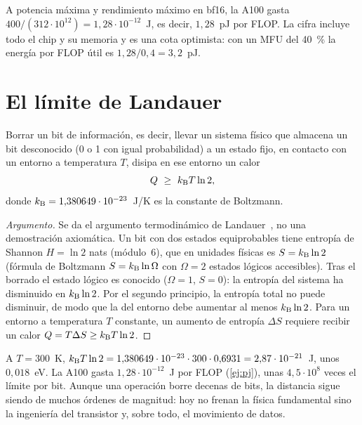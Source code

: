 \begin{ejemplo}\label{ej:pj}
A potencia máxima y rendimiento máximo en bf16, la A100 gasta $400/(312\cdot 10^{12})=1{,}28\cdot 10^{-12}$~J, es decir, $1{,}28$~pJ por FLOP. La cifra incluye todo el chip y su memoria y es una cota optimista: con un MFU del 40~\% la energía por FLOP útil es $1{,}28/0{,}4=3{,}2$~pJ.
\end{ejemplo}

\section{El límite de Landauer}

\begin{teorema}\label{teo:landauer}
Borrar un bit de información, es decir, llevar un sistema físico que almacena un bit desconocido (0 o 1 con igual probabilidad) a un estado fijo, en contacto con un entorno a temperatura $T$, disipa en ese entorno un calor
\[
Q\ \ge\ k_{\mathrm{B}} T\ln 2,
\]
donde $k_{\mathrm{B}}=1{,}380649\cdot 10^{-23}$~J/K es la constante de Boltzmann.
\end{teorema}

\begin{proof}[Argumento]
Se da el argumento termodinámico de Landauer~\cite{landauer}, no una demostración axiomática. Un bit con dos estados equiprobables tiene entropía de Shannon $H=\ln 2$ nats (módulo~6), que en unidades físicas es $S=k_{\mathrm{B}}\ln 2$ (fórmula de Boltzmann $S=k_{\mathrm{B}}\ln\Omega$ con $\Omega=2$ estados lógicos accesibles). Tras el borrado el estado lógico es conocido ($\Omega=1$, $S=0$): la entropía del sistema ha disminuido en $k_{\mathrm{B}}\ln 2$. Por el segundo principio, la entropía total no puede disminuir, de modo que la del entorno debe aumentar al menos $k_{\mathrm{B}}\ln 2$. Para un entorno a temperatura $T$ constante, un aumento de entropía $\Delta S$ requiere recibir un calor $Q=T\Delta S\ge k_{\mathrm{B}} T\ln 2$.
\end{proof}

\begin{ejemplo}\label{ej:landauer}
A $T=300$~K, $k_{\mathrm{B}} T\ln 2=1{,}380649\cdot 10^{-23}\cdot 300\cdot 0{,}6931=2{,}87\cdot 10^{-21}$~J, unos $0{,}018$~eV. La A100 gasta $1{,}28\cdot 10^{-12}$~J por FLOP (\cref{ej:pj}), unas $4{,}5\cdot 10^{8}$ veces el límite por bit. Aunque una operación borre decenas de bits, la distancia sigue siendo de muchos órdenes de magnitud: hoy no frenan la física fundamental sino la ingeniería del transistor y, sobre todo, el movimiento de datos.
\end{ejemplo}

